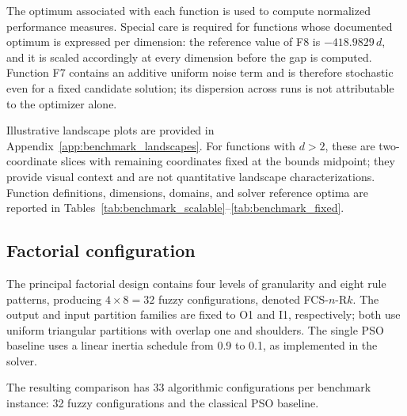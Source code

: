 The optimum associated with each function is used to compute normalized performance measures. Special care is required for functions whose documented optimum is expressed per dimension: the reference value of F8 is $-418.9829\,d$, and it is scaled accordingly at every dimension before the gap is computed. Function F7 contains an additive uniform noise term and is therefore stochastic even for a fixed candidate solution; its dispersion across runs is not attributable to the optimizer alone.





Illustrative landscape plots are provided in Appendix~\ref{app:benchmark_landscapes}. For functions with $d>2$, these are two-coordinate slices with remaining coordinates fixed at the bounds midpoint; they provide visual context and are not quantitative landscape characterizations. Function definitions, dimensions, domains, and solver reference optima are reported in Tables~\ref{tab:benchmark_scalable}--\ref{tab:benchmark_fixed}.

\subsection{Factorial configuration}
\label{subsec:factorial}

The principal factorial design contains four levels of granularity and eight rule patterns, producing $4\times 8=32$ fuzzy configurations, denoted FCS-$n$-R$k$. The output and input partition families are fixed to O1 and I1, respectively; both use uniform triangular partitions with overlap one and shoulders. The single PSO baseline uses a linear inertia schedule from 0.9 to 0.1, as implemented in the solver.

The resulting comparison has 33 algorithmic configurations per benchmark instance: 32 fuzzy configurations and the classical PSO baseline.

